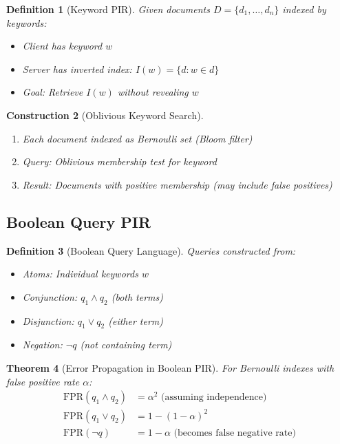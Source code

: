 \documentclass[11pt,final]{article}
\newtheorem{theorem}{Theorem}[section]
\newtheorem{definition}[theorem]{Definition}
\newtheorem{construction}[theorem]{Construction}
\begin{document}
\begin{definition}[Keyword PIR]
Given documents $D = \{d_1, \ldots, d_n\}$ indexed by keywords:
\begin{itemize}
    \item Client has keyword $w$
    \item Server has inverted index: $I(w) = \{d : w \in d\}$
    \item Goal: Retrieve $I(w)$ without revealing $w$
\end{itemize}
\end{definition}

\begin{construction}[Oblivious Keyword Search]
\begin{enumerate}
    \item Each document indexed as Bernoulli set (Bloom filter)
    \item Query: Oblivious membership test for keyword
    \item Result: Documents with positive membership (may include false positives)
\end{enumerate}
\end{construction}

\subsection{Boolean Query PIR}

\begin{definition}[Boolean Query Language]
Queries constructed from:
\begin{itemize}
    \item Atoms: Individual keywords $w$
    \item Conjunction: $q_1 \land q_2$ (both terms)
    \item Disjunction: $q_1 \lor q_2$ (either term)
    \item Negation: $\neg q$ (not containing term)
\end{itemize}
\end{definition}

\begin{theorem}[Error Propagation in Boolean PIR]
For Bernoulli indexes with false positive rate $\alpha$:
\begin{align}
\text{FPR}(q_1 \land q_2) &= \alpha^2 \text{ (assuming independence)}\\
\text{FPR}(q_1 \lor q_2) &= 1 - (1-\alpha)^2\\
\text{FPR}(\neg q) &= 1 - \alpha \text{ (becomes false negative rate)}
\end{align}
\end{theorem}
\end{document}
